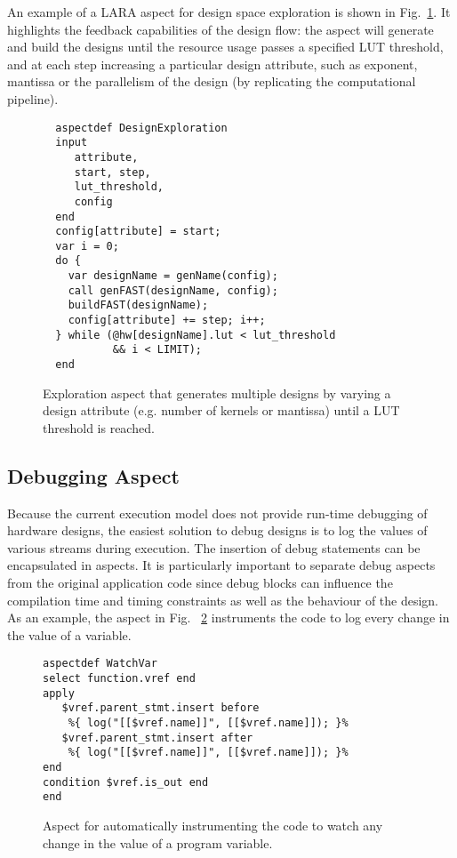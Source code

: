 An example of a LARA aspect for design space exploration is
shown in Fig.~\ref{fig:aspect-exploration}. It highlights the feedback capabilities of the design
flow: the aspect will generate and build the \FAST{} designs until the
resource usage passes a specified LUT threshold, and at each step
increasing a particular design attribute, such as exponent, mantissa or the parallelism of the design (by replicating the computational pipeline).

\lstset{style=lara}
\begin{figure}[!h]
\begin{lstlisting}
  aspectdef DesignExploration
  input
     attribute,
     start, step,
     lut_threshold,
     config
  end
  config[attribute] = start;
  var i = 0;
  do {
    var designName = genName(config);
    call genFAST(designName, config);
    buildFAST(designName);
    config[attribute] += step; i++;
  } while (@hw[designName].lut < lut_threshold
           && i < LIMIT);
  end
\end{lstlisting}
\caption{Exploration aspect that generates multiple \FAST{} designs by varying a design attribute (e.g. number of kernels or mantissa) until a LUT threshold is reached.}
\label{fig:aspect-exploration}
\end{figure}


\subsection{Debugging Aspect}
\label{sect:asp_debug}
Because the current execution model does not provide run-time debugging
of hardware designs, the easiest solution to debug designs is to log
the values of various streams during execution. The insertion of debug
statements can be encapsulated in aspects. It is particularly
important to separate debug aspects from the original application code
since debug blocks can influence the compilation time and timing
constraints as well as the behaviour of the design. As an example,
the aspect in Fig. ~\ref{fig:aspect-debug} instruments the code to log every change in the value of a variable.

\lstset{style=lara}
\begin{figure}[!h]
  \centering
\begin{lstlisting}
aspectdef WatchVar
select function.vref end
apply
   $vref.parent_stmt.insert before
    %{ log("[[$vref.name]]", [[$vref.name]]); }%
   $vref.parent_stmt.insert after
    %{ log("[[$vref.name]]", [[$vref.name]]); }%
end
condition $vref.is_out end
end
\end{lstlisting}
  \caption{Aspect for automatically instrumenting the code to watch any change in the value of a program variable.}
  \label{fig:aspect-debug}
\end{figure}

